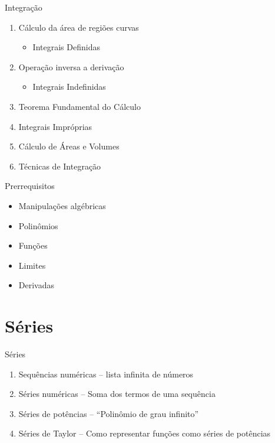 \documentclass[fleqn,utf8,aspectratio=169,12pt]{beamer}
\begin{document}
\begin{frame}{Integração}
  \begin{enumerate}[<+->]
    \item Cálculo da área de regiões curvas
    \begin{itemize}
      \item[] Integrais Definidas
    \end{itemize}
    \item Operação inversa a derivação
    \begin{itemize}
      \item[] Integrais Indefinidas
    \end{itemize}
    \item Teorema Fundamental do Cálculo
    \item Integrais Impróprias
    \item Cálculo de Áreas e Volumes \\[5mm]
    \item Técnicas de Integração
  \end{enumerate}
\end{frame}

\begin{frame}{Prerrequisitos}
  \begin{itemize}[<+->]
    \item Manipulações algébricas
    \item Polinômios
    \item Funções
    \item Limites
    \item Derivadas
  \end{itemize}
\end{frame}

\section{Séries}

\begin{frame}{Séries}
  \begin{enumerate}[<+->]
    \item Sequências numéricas \tabto{40mm} -- lista infinita de números
    \item Séries numéricas     \tabto{40mm} -- Soma dos termos de uma sequência \\[5mm]
    \item Séries de potências  \tabto{40mm} -- ``Polinômio de grau infinito''
    \item Séries de Taylor     \tabto{40mm} -- Como representar funções como séries de potências
  \end{enumerate}
\end{frame}
\end{document}
